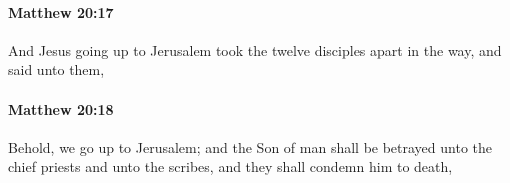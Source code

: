 		\paragraph{Matthew 20:17} %
			\label{MATTHEW-20-17}

			And Jesus going up to Jerusalem took the twelve disciples apart in the way, and said unto them,

			\begin{framed}
			\scriptsize
				\begin{compactdesc}
					\item[SBLG] 
				\end{compactdesc}
			\end{framed}

		\paragraph{Matthew 20:18} %
			\label{MATTHEW-20-18}

			Behold, we go up to Jerusalem; and the Son of man shall be betrayed unto the chief priests and unto the scribes, and they shall condemn him to death,

